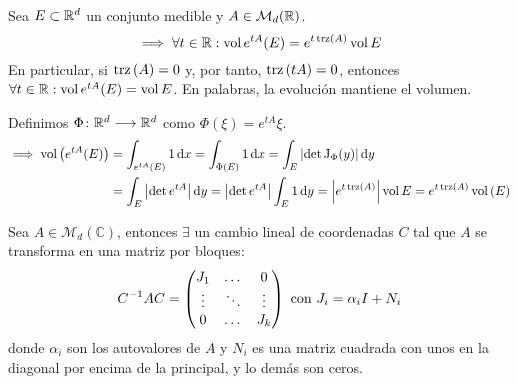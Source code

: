 \begin{cor}[Liouville]
	Sea $E \subset \mathbb{R}^d$ un conjunto medible y $A \in \mathcal{M}_d(\mathbb{R})$.
	\[\implies \forall t \in \mathbb{R} : \operatorname{vol}{e^{tA}(E)} = e^{t\operatorname{trz}\left(A\right)} \operatorname{vol}{E}\]
	En particular, si $\operatorname{trz}\left(A\right) =0$ y, por tanto, $\operatorname{trz}\left(tA\right) = 0$, entonces $\forall t \in \mathbb{R} : \operatorname{vol}{e^{tA}(E)} = \operatorname{vol}{E}$. En palabras, la evolución mantiene el volumen.
	\begin{dem}
		Definimos $\Phi \colon \mathbb{R}^d \longrightarrow \mathbb{R}^d$ como $\Phi(\xi) = e^{tA}\xi$.
		\[\begin{aligned}
				\implies \vol{\left(e^{tA} (E)\right)} & = \int_{e^{tA}(E)} 1 \odif{x} = \int_{\Phi(E)} 1 \odif{x} = \int_{E} \left|\det{\operatorname{J}_\Phi(y)}\right| \odif{y}                    \\
				                                       & = \int_{E} \left|\det{e^{tA}}\right| \odif{y} = \abs{\det{e^{tA}}} \int_{E} 1 \odif{y} = \abs{e^{t\trz{A}}} \vol{E} = e^{t\trz{A}} \vol{(E)}
			\end{aligned}\]
	\end{dem}
\end{cor}

\begin{teo}
	Sea $A \in \mathcal{M}_d(\mathbb{C})$, entonces $\exists$ un cambio lineal de coordenadas $C$ tal que $A$ se transforma en una matriz por bloques:
	\[C^{-1} A C = \begin{pmatrix}
			J_1    & \dots  & 0      \\
			\vdots & \ddots & \vdots \\
			0      & \dots  & J_k
		\end{pmatrix} \text{ con } J_i = \alpha_i I + N_i\]
	donde $\alpha_i$ son los autovalores de $A$ y $N_i$ es una matriz cuadrada con unos en la diagonal por encima de la principal, y lo demás son ceros.
\end{teo}

